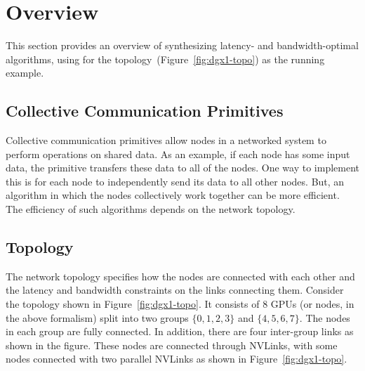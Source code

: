 \section{Overview}
This section provides an overview of synthesizing latency- and
bandwidth-optimal algorithms, using \allgather for the \dgxone
topology~(Figure~\ref{fig:dgx1-topo}) as the running example.

\subsection{Collective Communication Primitives}
\label{sec:background-collectives}
Collective communication primitives allow nodes in a networked system
to perform operations on shared data. As an example, if each node has
some input data, the \allgather primitive transfers these data to all
of the nodes.  One way to implement this is for each node to
independently send its data to all other nodes. But, an algorithm in
which the nodes collectively work together can be more efficient. The
efficiency of such algorithms depends on the network topology.


\subsection{Topology}
The network topology specifies how the nodes are connected with each
other and the latency and bandwidth constraints on the links
connecting them. Consider the \dgxone topology shown in
Figure~\ref{fig:dgx1-topo}. It consists of $8$ GPUs (or nodes, in the
above formalism) split into two groups $\{0,1,2,3\}$ and
$\{4,5,6,7\}$. The nodes in each group are fully connected. In
addition, there are four inter-group links as shown in the figure.
These nodes are connected through NVLinks, with some nodes connected
with two parallel NVLinks as shown in Figure~\ref{fig:dgx1-topo}.


